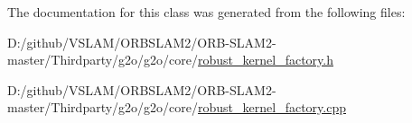 The documentation for this class was generated from the following files\+:\begin{DoxyCompactItemize}
\item 
D\+:/github/\+V\+S\+L\+A\+M/\+O\+R\+B\+S\+L\+A\+M2/\+O\+R\+B-\/\+S\+L\+A\+M2-\/master/\+Thirdparty/g2o/g2o/core/\mbox{\hyperlink{robust__kernel__factory_8h}{robust\+\_\+kernel\+\_\+factory.\+h}}\item 
D\+:/github/\+V\+S\+L\+A\+M/\+O\+R\+B\+S\+L\+A\+M2/\+O\+R\+B-\/\+S\+L\+A\+M2-\/master/\+Thirdparty/g2o/g2o/core/\mbox{\hyperlink{robust__kernel__factory_8cpp}{robust\+\_\+kernel\+\_\+factory.\+cpp}}\end{DoxyCompactItemize}
